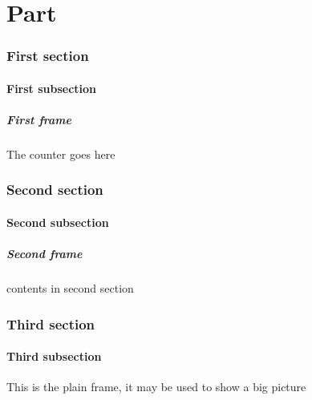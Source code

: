 \documentclass[no-math, xcolor=table]{beamer} %
\begin{document}




\part{Part}
\begin{frame}
	\partpage
\end{frame}




\begin{frame}
\sectionpage
\end{frame}

\section{First section}
	\subsection{First subsection}
	\begin{frame}[c]\frametitle{First frame}
	The counter goes here
\end{frame}

\section{Second section}
	\subsection{Second subsection}
	\begin{frame}[c]\frametitle{Second frame}
	contents in second section
\end{frame}



\section*{Third section} %
	\subsection{Third subsection}
	\begin{frame}[plain]

	This is the plain frame, it may be used to show a big picture

	\end{frame}
\end{document}
